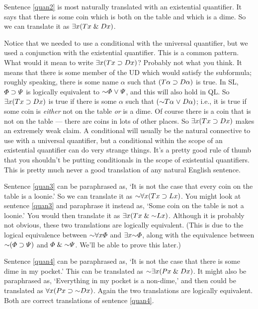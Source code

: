 Sentence \ref{quan2} is most naturally translated with an existential quantifier. It says that there is some coin which is both on the table and which is a dime. So we can translate it as $\exists x(Tx \mathrel\& Dx)$.

Notice that we needed to use a conditional with the universal quantifier, but we used a conjunction with the existential quantifier. This is a common pattern. What would it mean to write $\exists x(Tx \supset Dx)$? Probably not what you think. It means that there is some member of the UD which would satisfy the subformula; roughly speaking, there is some name $\alpha$ such that $(T\alpha \supset D\alpha)$ is true. In SL, $\varPhi{} \supset \varPsi{}$ is logically equivalent to $\enot\metaA{} \eor \metaB{}$, and this will also hold in QL. So $\exists x(Tx \supset Dx)$ is true if there is some $\alpha$ such that $(\enot T\alpha \eor D\alpha)$; i.e., it is true if some coin is \emph{either} not on the table \emph{or} is a dime. Of course there is a coin that is not on the table --- there are coins in lots of other places. So $\exists x(Tx \supset Dx)$ makes an extremely weak claim. A conditional will usually be the natural connective to use with a universal quantifier, but a conditional within the scope of an existential quantifier can do very strange things. It's a pretty good rule of thumb that you shouldn't be putting conditionals in the scope of existential quantifiers. This is pretty much never a good translation of any natural English sentence.

Sentence \ref{quan3} can be paraphrased as, `It is not the case that every coin on the table is a loonie.' So we can translate it as $\enot \qt{\forall}{x}(Tx \eif Lx)$. You might look at sentence \ref{quan3} and paraphrase it instead as, `Some coin on the table is not a loonie.' You would then translate it as $\qt{\exists}{x}(Tx \eand \enot Lx)$. Although it is probably not obvious, these two translations are logically equivalent. (This is due to the logical equivalence between $\enot\qt{\forall}{x}\metaA{}$ and $\qt{\exists}{x}\enot\metaA{}$, along with the equivalence between $\enot(\metaA{}\eif\metaB{})$ and $\metaA{}\eand\enot\metaB{}$. We'll be able to prove this later.)

Sentence \ref{quan4} can be paraphrased as, `It is not the case that there is some dime in my pocket.' This can be translated as $\enot\qt{\exists}{x}(Px \eand Dx)$. It might also be paraphrased as, `Everything in my pocket is a non-dime,' and then could be translated as $\qt{\forall}{x}(Px \eif \enot Dx)$. Again the two translations are logically equivalent. Both are correct translations of sentence \ref{quan4}.

